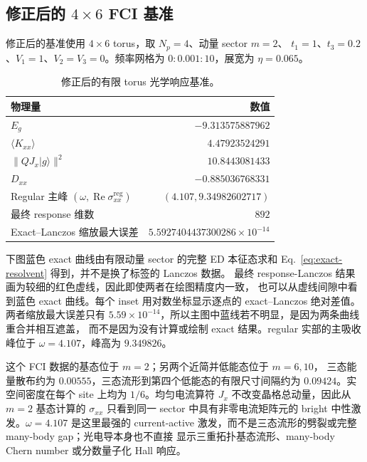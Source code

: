 \documentclass[11pt]{article}
\begin{document}
\clearpage
\subsection{修正后的 \texorpdfstring{\(4\times6\)}{4x6} FCI 基准}

修正后的基准使用 \(4\times6\) torus，取 \(N_p=4\)、动量 sector \(m=2\)、
\(t_1=1\)、\(t_3=0.2\)、\(V_1=1\)、\(V_2=V_3=0\)。频率网格为
\(0:0.001:10\)，展宽为 \(\eta=0.065\)。

\begin{table}[h]
\centering
\caption{修正后的有限 torus 光学响应基准。}
\begin{tabular}{lr}
\toprule
物理量 & 数值 \\
\midrule
\(E_g\) & \(-9.313575887962\) \\
\(\langle K_{xx}\rangle\) & \(4.47923524291\) \\
\(\lVert QJ_x\lvert g\rangle\rVert^2\) & \(10.8443081433\) \\
\(D_{xx}\) & \(-0.885036768331\) \\
Regular 主峰 \((\omega,\operatorname{Re}\sigma_{xx}^{\mathrm{reg}})\) &
\((4.107,9.34982602717)\) \\
最终 response 维数 & \(892\) \\
Exact--Lanczos 缩放最大误差 & \(5.5927404437300286\times10^{-14}\) \\
\bottomrule
\end{tabular}
\end{table}

下图蓝色 exact 曲线由有限动量 sector 的完整 ED 本征态求和
Eq.~\eqref{eq:exact-resolvent} 得到，并不是换了标签的 Lanczos 数据。
最终 response-Lanczos 结果画为较细的红色虚线，因此即使两者在绘图精度内一致，
也可以从虚线间隙中看到蓝色 exact 曲线。每个 inset 用对数坐标显示逐点的
exact--Lanczos 绝对差值。两者缩放最大误差只有
\(5.59\times10^{-14}\)，所以主图中蓝线若不明显，是因为两条曲线重合并相互遮盖，
而不是因为没有计算或绘制 exact 结果。regular 实部的主吸收峰位于
\(\omega=4.107\)，峰高为 \(9.349826\)。

这个 FCI 数据的基态位于 \(m=2\)；另两个近简并低能态位于 \(m=6,10\)，
三态能量散布约为 \(0.00555\)，三态流形到第四个低能态的有限尺寸间隔约为
\(0.09424\)。实空间密度在每个 site 上均为 \(1/6\)。均匀电流算符 \(J_x\)
不改变晶格总动量，因此从 \(m=2\) 基态计算的 \(\sigma_{xx}\) 只看到同一 sector
中具有非零电流矩阵元的 bright 中性激发。\(\omega=4.107\) 是这里最强的
current-active 激发，而不是三态流形的劈裂或完整 many-body gap；光电导本身也不直接
显示三重拓扑基态流形、many-body Chern number 或分数量子化 Hall 响应。
\end{document}
